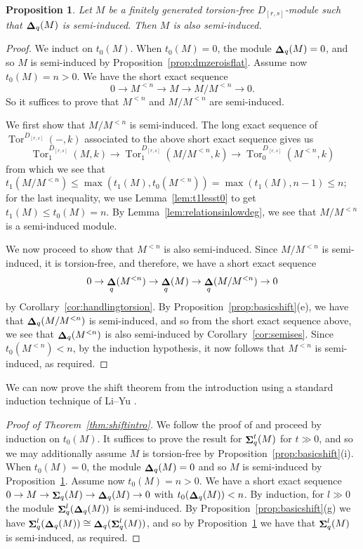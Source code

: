 \documentclass[12pt]{amsart}
\DeclareMathOperator{\Tor}{Tor}
\DeclareMathOperator{\Sh}{\bf{\Sigma}}
\DeclareMathOperator{\De}{\bf{\Delta}}
\newcommand{\Drs}{D_{[r,s]}}
\newcommand{\mShq}{\Sh_{q}}
\newcommand{\mDeq}{\De_{q}}
\numberwithin{equation}{section}
\newtheorem{proposition}[equation]{Proposition}
\theoremstyle{definition}
\theoremstyle{plain}
\begin{document}
\begin{proposition}\label{prop:liftingsemi}
	Let $M$ be a finitely generated torsion-free $\Drs$-module such that $\mDeq(M)$ is semi-induced. Then $M$ is also semi-induced.
\end{proposition}
\begin{proof}
	We induct on $t_0(M)$. When $t_0(M) = 0$, the module $\mDeq(M) = 0$, and so $M$ is semi-induced by Proposition~\ref{prop:dmzeroisflat}. Assume now $t_0(M) = n > 0$. 
	We have the short exact sequence
	\begin{displaymath}
	0 \to M^{<n} \to M \to M/M^{<n} \to 0.
	\end{displaymath}
	So it suffices to prove that $M^{<n}$ and $M/M^{<n}$ are semi-induced.
	
	We first show that $M/M^{<n}$ is semi-induced. The long exact sequence of $\Tor^{\Drs}(-, k)$ associated to the above short exact sequence gives us 
	\begin{displaymath}
    \Tor_1^{\Drs}(M, k) \to \Tor_1^{\Drs}(M/M^{<n}, k) \to \Tor_0^{\Drs}(M^{<n}, k)
    \end{displaymath}
	from which we see that $t_1(M/M^{<n}) \leq \max(t_1(M), t_0(M^{<n})) = \max(t_1(M), n-1) \leq n$; for the last inequality, we use Lemma~\ref{lem:t1lesst0} to get $t_1(M) \leq t_0(M) = n$. By Lemma~\ref{lem:relationsinlowdeg}, we see that $M/M^{<n}$ is a semi-induced module. 
	
    We now proceed to show that $M^{<n}$ is also semi-induced. Since $M/M^{<n}$ is semi-induced, it is torsion-free, and therefore, we have a short exact sequence
    \begin{displaymath}
    0 \to \mDeq(M^{<n}) \to \mDeq(M) \to \mDeq(M/M^{<n}) \to 0
    \end{displaymath}
    by Corollary~\ref{cor:handlingtorsion}. By Proposition~\ref{prop:basicshift}(e), we have that $\mDeq(M/M^{<n})$ is semi-induced, and so from the short exact sequence above, we see that $\mDeq(M^{<n})$ is also semi-induced by Corollary~\ref{cor:semises}. Since $t_0(M^{<n}) < n$, by the induction hypothesis, it now follows that $M^{<n}$ is semi-induced, as required. 
\end{proof}
We can now prove the shift theorem from the introduction using a standard induction technique of Li--Yu \cite{ly17fi}.
\begin{proof}[Proof of Theorem~\ref{thm:shiftintro}]
We follow the proof of \cite[Theorem~3.13]{ly17fi} and proceed by induction on $t_0(M)$. It suffices to prove the result for $\mShq^t(M)$ for $t \gg 0$, and so we may additionally assume $M$ is torsion-free by Proposition~\ref{prop:basicshift}(i). When $t_0(M) = 0$, the module $\mDeq(M)=0$ and so $M$ is semi-induced by Proposition~\ref{prop:liftingsemi}. Assume now $t_0(M) = n > 0$. We have a short exact sequence $0 \to M \to \mShq(M) \to \mDeq(M) \to 0$ with $t_0(\mDeq(M)) < n$. By induction, for $l\gg 0$ the module $\mShq^{l}(\mDeq(M))$ is semi-induced. By Proposition~\ref{prop:basicshift}(g) we have $\mShq^{l}(\mDeq(M)) \cong \mDeq(\mShq^{l}(M))$, and so by Proposition~\ref{prop:liftingsemi} we have that $\mShq^l(M)$ is semi-induced, as required. 
\end{proof}
\end{document}
